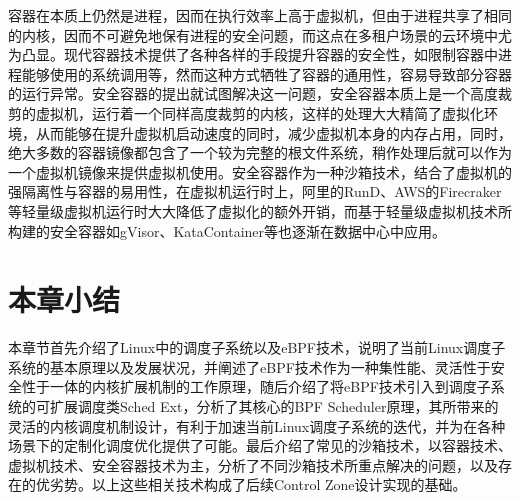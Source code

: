 容器在本质上仍然是进程，因而在执行效率上高于虚拟机，但由于进程共享了相同的内核，因而不可避免地保有进程的安全问题，而这点在多租户场景的云环境中尤为凸显。现代容器技术提供了各种各样的手段提升容器的安全性，如限制容器中进程能够使用的系统调用等，然而这种方式牺牲了容器的通用性，容易导致部分容器的运行异常。安全容器的提出就试图解决这一问题，安全容器本质上是一个高度裁剪的虚拟机，运行着一个同样高度裁剪的内核，这样的处理大大精简了虚拟化环境，从而能够在提升虚拟机启动速度的同时，减少虚拟机本身的内存占用，同时，绝大多数的容器镜像都包含了一个较为完整的根文件系统，稍作处理后就可以作为一个虚拟机镜像来提供虚拟机使用。安全容器作为一种沙箱技术，结合了虚拟机的强隔离性与容器的易用性，在虚拟机运行时上，阿里的RunD\citep{li2022rund}、AWS的Firecraker\citep{agache2020firecracker}等轻量级虚拟机运行时大大降低了虚拟化的额外开销，而基于轻量级虚拟机技术所构建的安全容器如gVisor、KataContainer\citep{randazzo2019kata}等也逐渐在数据中心中应用。

\section{本章小结}

本章节首先介绍了Linux中的调度子系统以及eBPF技术，说明了当前Linux调度子系统的基本原理以及发展状况，并阐述了eBPF技术作为一种集性能、灵活性于安全性于一体的内核扩展机制的工作原理，随后介绍了将eBPF技术引入到调度子系统的可扩展调度类Sched Ext，分析了其核心的BPF Scheduler原理，其所带来的灵活的内核调度机制设计，有利于加速当前Linux调度子系统的迭代，并为在各种场景下的定制化调度优化提供了可能。最后介绍了常见的沙箱技术，以容器技术、虚拟机技术、安全容器技术为主，分析了不同沙箱技术所重点解决的问题，以及存在的优劣势。以上这些相关技术构成了后续Control Zone设计实现的基础。